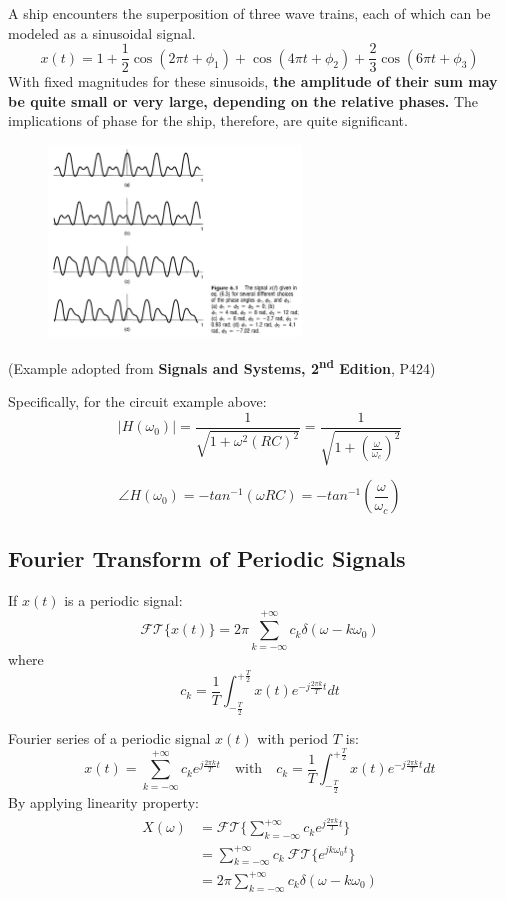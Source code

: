 \begin{ex}{}
    A ship encounters the superposition of three wave trains, each of which can be modeled as a sinusoidal signal. 
    \[ 
    x(t) = 1+\frac{1}{2}\cos(2\pi t + \phi_{1})+\cos(4\pi t + \phi_{2})+\frac{2}{3}\cos(6\pi t + \phi_{3})
    \]
    With fixed magnitudes for these sinusoids, \textbf{the amplitude of their sum may be quite small or very large, depending on the relative phases.} The implications of phase for the ship, therefore, are quite significant. 
    \begin{figure}[H] 
        \centering
        \includegraphics[width=0.6\textwidth]{images/phase}
    \end{figure}
    (Example adopted from \textbf{Signals and Systems, 2\textsuperscript{nd} Edition}, P424)
\end{ex}

Specifically, for the circuit example above:
\[ 
\lvert H(\omega_{0}) \rvert =  \frac{1}{\sqrt{1+\omega^{2}(RC)^{2} }} = \frac{1}{\sqrt{1+(\frac{\omega}{\omega_{c}})^{2}}} 
\]

\[ 
\angle H(\omega_{0}) = -tan^{-1}(\omega RC) = -tan^{-1}(\frac{\omega}{\omega_{c}})
\]

\subsection{Fourier Transform of Periodic Signals}
If $x(t)$ is a periodic signal:
\[ 
\mathcal{FT} \{ x(t) \} = 2\pi \sum_{k=-\infty}^{+\infty} c_{k} \delta(\omega - k\omega_{0}) 
\]
where 
\[ 
c_{k}=\frac{1}{T} \int_{-\frac{T}{2}}^{+\frac{T}{2}} x(t) e^{-j\frac{2 \pi k}{T} t} dt 
\]
\begin{dv}{}
    Fourier series of a periodic signal $x(t)$ with period $T$ is:
    \[ 
    x(t) = \sum_{k=-\infty}^{+\infty}c_{k}e^{j \frac{2\pi k}{T}t} \quad \text{with} \quad c_{k} = \frac{1}{T} \int_{-\frac{T}{2}}^{+\frac{T}{2}} x(t)e^{-j \frac{2\pi k}{T}t} dt 
    \]
    By applying linearity property:
    \begin{align*}
    \begin{split}
         X(\omega) 
         &= \mathcal{FT} \bigg\{ \sum_{k=-\infty}^{+\infty}c_{k}e^{j \frac{2\pi k}{T}t} \bigg\} \\
         &=\sum_{k=-\infty}^{+\infty}c_{k} \ \mathcal{FT}\{ e^{jk\omega_{0} t}\}\\
         &= 2\pi \sum_{k=-\infty}^{+\infty} c_{k} \delta(\omega - k\omega_{0}) 
    \end{split}
    \end{align*}
\end{dv}

